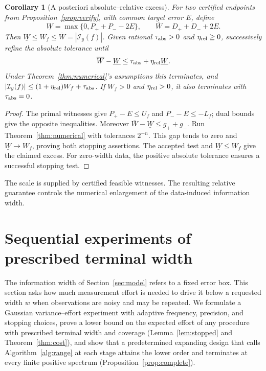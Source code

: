 \documentclass[10pt]{amsart}
\newtheorem{corollary}[theorem]{Corollary}
\theoremstyle{definition}
\theoremstyle{remark}
\theoremstyle{plain}
\begin{document}
\begin{corollary}[A posteriori absolute--relative excess]\label{cor:relative}
For two certified endpoints from Proposition~\ref{prop:verify}, with common target error $E$, define
\[
 \underline W=\max\{0,P_++P_- -2E\},\qquad
 \overline W=D_++D_-+2E.
\]
Then $\underline W\le W_f\le\overline W=|\mathcal I_y(f)|$. Given rational $\tau_{\rm abs}>0$ and $\eta_{\rm rel}\ge0$, successively refine the absolute tolerance until
\begin{equation}\label{eq:relative}
 \overline W-\underline W\le\tau_{\rm abs}+\eta_{\rm rel}\underline W.
\end{equation}
Under Theorem~\ref{thm:numerical}'s assumptions this terminates, and
$|\mathcal I_y(f)|\le(1+\eta_{\rm rel})W_f+\tau_{\rm abs}$.
If $W_f>0$ and $\eta_{\rm rel}>0$, it also terminates with $\tau_{\rm abs}=0$.
\end{corollary}
\begin{proof}
The primal witnesses give $P_+-E\le U_f$ and $P_--E\le -L_f$; dual bounds give the opposite inequalities. Moreover $\overline W-\underline W\le g_++g_-$. Run Theorem~\ref{thm:numerical} with tolerances $2^{-n}$. This gap tends to zero and $\underline W\to W_f$, proving both stopping assertions. The accepted test and $\underline W\le W_f$ give the claimed excess. For zero-width data, the positive absolute tolerance ensures a successful stopping test.
\end{proof}
The scale is supplied by certified feasible witnesses. The resulting relative guarantee controls the numerical enlargement of the data-induced information width.

\section{Sequential experiments of prescribed terminal width}\label{sec:sequential}
The information width of Section~\ref{sec:model} refers to a fixed error box. This section asks how much measurement effort is needed to drive it below a requested width $w$ when observations are noisy and may be repeated. We formulate a Gaussian variance--effort experiment with adaptive frequency, precision, and stopping choices, prove a lower bound on the expected effort of any procedure with prescribed terminal width and coverage (Lemma~\ref{lem:stopped} and Theorem~\ref{thm:cost}), and show that a predetermined expanding design that calls Algorithm~\ref{alg:range} at each stage attains the lower order and terminates at every finite positive spectrum (Proposition~\ref{prop:complete}).
\end{document}
